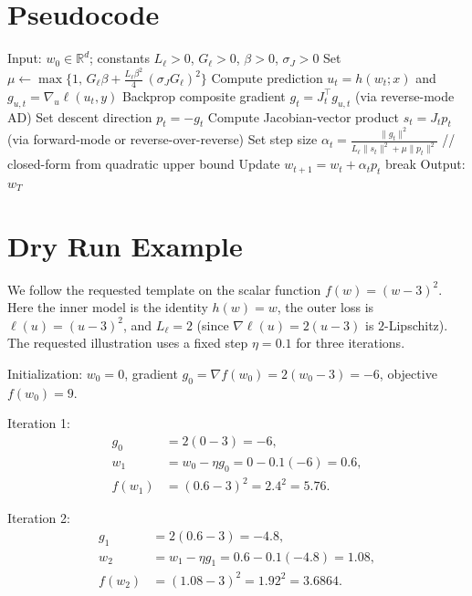 \documentclass[11pt]{article}
\newcommand{\R}{\mathbb{R}}
\begin{document}
\section*{Pseudocode}
\begin{algorithm}[H]
\caption{Deep Frank-Wolfe with Proximal Linearization (DFW-PL)}
\begin{algorithmic}[1]
\STATE Input: $w_0\in\R^d$; constants $L_\ell>0$, $G_\ell>0$, $\beta>0$, $\sigma_J>0$
\STATE Set $\mu \leftarrow \max\!\Big\{1,\, G_\ell \beta + \frac{L_\ell \beta^2}{4}\,(\sigma_J G_\ell)^2\Big\}$
  \STATE Compute prediction $u_t = h(w_t;x)$ and $g_{u,t} = \nabla_u \ell(u_t,y)$
  \STATE Backprop composite gradient $g_t = J_t^\top g_{u,t}$ (via reverse-mode AD)
  \STATE Set descent direction $p_t = -g_t$
  \STATE Compute Jacobian-vector product $s_t = J_t p_t$ (via forward-mode or reverse-over-reverse)
  \STATE Set step size $\displaystyle \alpha_t = \frac{\|g_t\|^2}{L_\ell \|s_t\|^2 + \mu \|p_t\|^2}$  // closed-form from quadratic upper bound
  \STATE Update $w_{t+1} = w_t + \alpha_t p_t$
    \STATE break
  \ENDIF
\ENDFOR
\STATE Output: $w_T$
\end{algorithmic}
\end{algorithm}

\section*{Dry Run Example}
We follow the requested template on the scalar function $f(w)=(w-3)^2$. Here the inner model is the identity $h(w)=w$, the outer loss is $\ell(u)=(u-3)^2$, and $L_\ell=2$ (since $\nabla \ell(u)=2(u-3)$ is $2$-Lipschitz). The requested illustration uses a fixed step $\eta=0.1$ for three iterations.

Initialization: $w_0=0$, gradient $g_0 = \nabla f(w_0)=2(w_0-3) = -6$, objective $f(w_0)=9$.

Iteration 1:
\[
\begin{aligned}
g_0 &= 2(0-3) = -6,\\
w_1 &= w_0 - \eta g_0 = 0 - 0.1(-6) = 0.6,\\
f(w_1) &= (0.6-3)^2 = 2.4^2 = 5.76.
\end{aligned}
\]

Iteration 2:
\[
\begin{aligned}
g_1 &= 2(0.6-3) = -4.8,\\
w_2 &= w_1 - \eta g_1 = 0.6 - 0.1(-4.8) = 1.08,\\
f(w_2) &= (1.08-3)^2 = 1.92^2 = 3.6864.
\end{aligned}
\]
\end{document}
